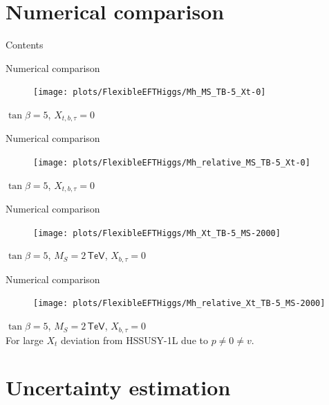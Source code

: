 \documentclass[hyperref={pdfpagelabels=false},ngerman]{beamer}
\newcommand{\eh}[1]{\,\mathsf{#1}}
\begin{document}

\section{Numerical comparison}

\begin{frame}{Contents}
  \tableofcontents[currentsection]  
\end{frame}

\begin{frame}{Numerical comparison}
  \begin{figure}
    \centering
    \texttt{[image: plots/FlexibleEFTHiggs/Mh\_MS\_TB-5\_Xt-0]}
  \end{figure}
  $\tan\beta = 5$, $X_{t,b,\tau} = 0$
\end{frame}

\begin{frame}{Numerical comparison}
  \begin{figure}
    \centering
    \texttt{[image: plots/FlexibleEFTHiggs/Mh\_relative\_MS\_TB-5\_Xt-0]}
  \end{figure}
  $\tan\beta = 5$, $X_{t,b,\tau} = 0$
\end{frame}

\begin{frame}{Numerical comparison}
  \begin{figure}
    \centering
    \texttt{[image: plots/FlexibleEFTHiggs/Mh\_Xt\_TB-5\_MS-2000]}
  \end{figure}
  $\tan\beta = 5$, $M_S = 2 \eh{TeV}$, $X_{b,\tau} = 0$
\end{frame}

\begin{frame}{Numerical comparison}
  \begin{figure}
    \centering
    \texttt{[image: plots/FlexibleEFTHiggs/Mh\_relative\_Xt\_TB-5\_MS-2000]}
  \end{figure}
  $\tan\beta = 5$, $M_S = 2 \eh{TeV}$, $X_{b,\tau} = 0$\\
  For large $X_t$ deviation from HSSUSY-1L due to $p\neq 0 \neq v$.
\end{frame}


\section{Uncertainty estimation}
\end{document}
